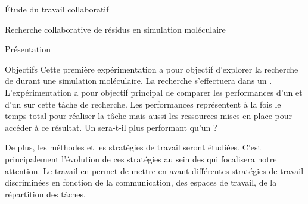 \documentclass[myfrancais]{mythesis}
\begin{document}
\begin{mypart}{Étude du travail collaboratif}
\begin{mychapter}{Recherche collaborative de résidus en simulation moléculaire}
\begin{mysection}{Présentation}
\begin{mysubsection}{Objectifs}
					Cette première expérimentation a pour objectif d'explorer la recherche de  durant une simulation moléculaire.
					La recherche s'effectuera dans un .
					L'expérimentation a pour objectif principal de comparer les performances d'un  et d'un  sur cette tâche de recherche.
					Les performances représentent à la fois le temps total pour réaliser la tâche mais aussi les ressources mises en place pour accéder à ce résultat.
					Un  sera-t-il plus performant qu'un  ?

					De plus, les méthodes et les stratégies de travail seront étudiées.
					C'est principalement l'évolution de ces stratégies au sein des  qui focalisera notre attention.
					Le travail en  permet de mettre en avant différentes stratégies de travail discriminées en fonction de la communication, des espaces de travail, de la répartition des tâches, \myetc


\end{mysubsection}
\end{mysection}
\end{mychapter}
\end{mypart}
\end{document}
